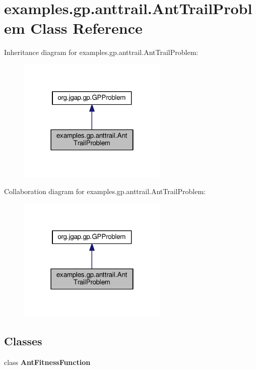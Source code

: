 \hypertarget{classexamples_1_1gp_1_1anttrail_1_1_ant_trail_problem}{\section{examples.\-gp.\-anttrail.\-Ant\-Trail\-Problem Class Reference}
\label{classexamples_1_1gp_1_1anttrail_1_1_ant_trail_problem}
}


Inheritance diagram for examples.\-gp.\-anttrail.\-Ant\-Trail\-Problem\-:
\nopagebreak
\begin{figure}[H]
\begin{center}
\leavevmode
\includegraphics[width=202pt]{classexamples_1_1gp_1_1anttrail_1_1_ant_trail_problem__inherit__graph}
\end{center}
\end{figure}


Collaboration diagram for examples.\-gp.\-anttrail.\-Ant\-Trail\-Problem\-:
\nopagebreak
\begin{figure}[H]
\begin{center}
\leavevmode
\includegraphics[width=202pt]{classexamples_1_1gp_1_1anttrail_1_1_ant_trail_problem__coll__graph}
\end{center}
\end{figure}
\subsection*{Classes}
\begin{DoxyCompactItemize}
\item 
class {\bfseries Ant\-Fitness\-Function}
\end{DoxyCompactItemize}
